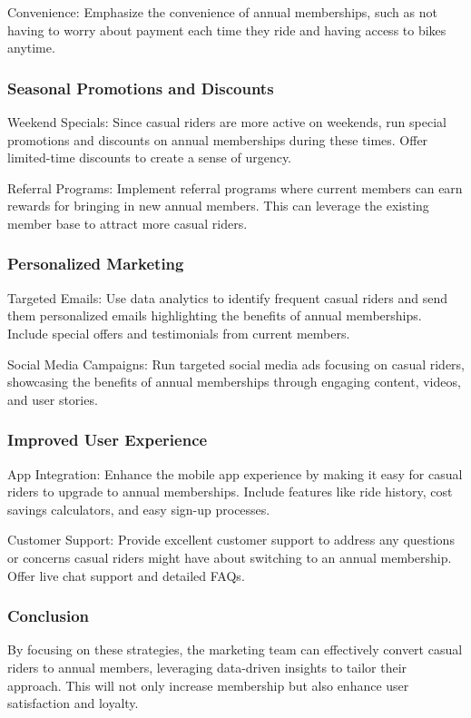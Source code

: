 \documentclass[
]{article}
\begin{document}
Convenience: Emphasize the convenience of annual memberships, such as
not having to worry about payment each time they ride and having access
to bikes anytime.

\subsubsection{Seasonal Promotions and
Discounts}\label{seasonal-promotions-and-discounts}

Weekend Specials: Since casual riders are more active on weekends, run
special promotions and discounts on annual memberships during these
times. Offer limited-time discounts to create a sense of urgency.

Referral Programs: Implement referral programs where current members can
earn rewards for bringing in new annual members. This can leverage the
existing member base to attract more casual riders.

\subsubsection{Personalized Marketing}\label{personalized-marketing}

Targeted Emails: Use data analytics to identify frequent casual riders
and send them personalized emails highlighting the benefits of annual
memberships. Include special offers and testimonials from current
members.

Social Media Campaigns: Run targeted social media ads focusing on casual
riders, showcasing the benefits of annual memberships through engaging
content, videos, and user stories.

\subsubsection{Improved User Experience}\label{improved-user-experience}

App Integration: Enhance the mobile app experience by making it easy for
casual riders to upgrade to annual memberships. Include features like
ride history, cost savings calculators, and easy sign-up processes.

Customer Support: Provide excellent customer support to address any
questions or concerns casual riders might have about switching to an
annual membership. Offer live chat support and detailed FAQs.

\subsubsection{Conclusion}\label{conclusion}

By focusing on these strategies, the marketing team can effectively
convert casual riders to annual members, leveraging data-driven insights
to tailor their approach. This will not only increase membership but
also enhance user satisfaction and loyalty.
\end{document}
